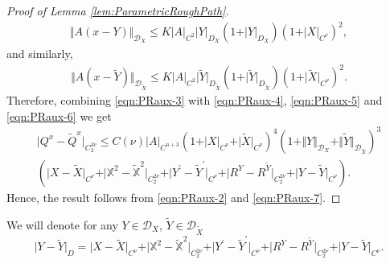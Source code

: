 \documentclass[11pt,a4paper,leqno]{amsart}%
\theoremstyle{plain}
\theoremstyle{remark}
\theoremstyle{plain}
\numberwithin{equation}{section}
\begin{document}
\begin{proof}[ Proof of Lemma \ref{lem:ParametricRoughPath}]
\begin{eqnarray}
\Vert A(x-Y)\Vert_{\mathcal{D}_X}\leq
K\vert A\vert_{C^2}\vert Y\vert_{D_X}(1+\vert Y\vert_{D_X})(1+\vert X\vert_{C^{\nu}})^2,\label{eqn:PRaux-5}
\end{eqnarray}
and similarly,
\begin{eqnarray}
\Vert A(x-\tilde{Y})\Vert_{\mathcal{D}_{\tilde{X}}}\leq
K\vert A\vert_{C^2}\vert \tilde{Y}\vert_{D_{\tilde{X}}}(1+\vert \tilde{Y}\vert_{D_{\tilde{X}}})(1+\vert \tilde{X}\vert_{C^{\nu}})^2.\label{eqn:PRaux-6}
\end{eqnarray}
Therefore, combining \eqref{eqn:PRaux-3} with \eqref{eqn:PRaux-4},
\eqref{eqn:PRaux-5} and \eqref{eqn:PRaux-6} we get
\begin{multline}\label{eqn:PRaux-7}
\vert Q^x-\tilde{Q}^x\vert_{C_2^{3\nu}}\leq C(\nu)\vert A\vert_{C^{n+3}}(1+\vert X\vert_{C^{\nu}}+\vert \tilde{X}\vert_{C^{\nu}})^4(1+\Vert Y\Vert_{\mathcal{D}_X}+\Vert \tilde{Y}\Vert_{\mathcal{D}_{\tilde{X}}})^3\\
(\vert X-\tilde{X}\vert_{C^{\nu}}+\vert \mathbb{X}^2-\mathbb{\tilde{X}}^2\vert_{C_2^{2\nu}}+\vert Y^\prime-\tilde{Y}^\prime\vert_{C^{\nu}}+\vert R^Y-R^{\tilde{Y}}\vert_{C_2^{2\nu}}+\vert Y-\tilde{Y}\vert_{C^{\nu}}).
\end{multline}
Hence, the result follows from \eqref{eqn:PRaux-2} and
\eqref{eqn:PRaux-7}.
\end{proof}
We will denote for any $Y\in\mathcal{D}_X$,
$\tilde{Y}\in\mathcal{D}_{\tilde{X}}$
$$
\vert Y-\tilde{Y}\vert_D=\vert X-\tilde{X}\vert_{C^{\nu}}+\vert \mathbb{X}^2-\mathbb{\tilde{X}}^2\vert_{C_2^{2\nu}}+\vert Y^\prime-\tilde{Y}^\prime\vert_{C^{\nu}}+\vert R^Y-R^{\tilde{Y}}\vert_{C_2^{2\nu}}+\vert Y-\tilde{Y}\vert_{C^{\nu}}.
$$
\end{document}
